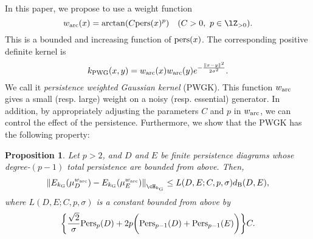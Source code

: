 \documentclass{article}
\newtheorem{prop}[thm]{Proposition}
\newcommand{\Pers}{{\rm Pers}}
\newcommand{\pers}{{\rm pers}}
\providecommand{\norm}[1]{\left\lVert#1\right\rVert}
\providecommand{\dk}[4]{\norm{E_{#1}(\mu^{#2}_{#3}) - E_{#1}(\mu^{#2}_{#4})}_{\cH_{#1}}}
\begin{document}
In this paper, we propose to use a weight function 
\[
w_{{\rm arc}}(x) = \arctan (C \pers(x)^{p}) ~~~ (C>0, \ p \in \lZ_{>0}).
\]
This is a bounded and increasing function of $\pers(x)$.
The corresponding positive definite kernel is
\begin{equation}
k_{{\rm PWG}}(x,y)=w_{{\rm arc}}(x)w_{{\rm arc}}(y)e^{-\frac{\norm{x-y}^{2}}{2 \sigma^{2}}}.
\end{equation}
We call it {\em persistence weighted Gaussian kernel} (PWGK).
This function $w_{{\rm arc}}$ gives a small (resp. large) weight on a noisy (resp. essential) generator. 
In addition, by appropriately adjusting the parameters $C$ and $p$ in $w_{{\rm arc}}$, we can control the effect of the persistence.  
Furthermore, we show that the PWGK has the following property: 

\begin{prop}
\label{prop:general_stability}
Let $p > 2$, and $D$ and $E$ be finite persistence diagrams whose degree-$(p-1)$ total persistence are bounded from above.
Then,
\begin{align*}
\dk{k_{{\rm G}}}{w_{{\rm arc}}}{D}{E} \leq L(D,E;C,p,\sigma) d_{{\rm B}}(D,E),
\end{align*}
where $L(D,E;C,p,\sigma)$ is a constant bounded from above by
\begin{align*}
\biggl\{ \frac{\sqrt{2}}{\sigma} \Pers_{p}(D)+ 2p \biggl( \Pers_{p-1}(D) + \Pers_{p-1}(E) \biggr)  \biggr\} C .
\end{align*}
\end{prop}
\end{document}
